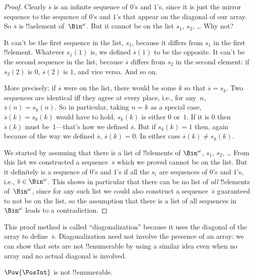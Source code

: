 \documentclass[../../../include/open-logic-section]{subfiles}
\begin{document}
\begin{proof}
Clearly $\overline{s}$ is an infinite sequence of $0$'s and
$1$'s, since it is just the mirror sequence to the sequence of $0$'s
and $1$'s that appear on the diagonal of our array.  So $\overline{s}$
is !!a{element} of~$\Bin^\omega$.  But it cannot be on the list $s_1$,
$s_2$, \dots{} Why not?

It can't be the first sequence in the list, $s_1$, because it differs from
$s_1$ in the first !!{element}.  Whatever $s_1(1)$ is, we defined
$\overline{s}(1)$ to be the opposite.  It can't be the second
sequence in the list, because $\overline{s}$ differs from $s_2$ in the second
element: if $s_2(2)$ is $0$, $\overline{s}(2)$ is $1$, and vice
versa. And so on.

More precisely: if $\overline{s}$ were on the list, there would be
some $k$ so that $\overline{s} = s_{k}$.  Two sequences are identical
iff they agree at every place, i.e., for any~$n$, $\overline{s}(n) =
s_{k}(n)$.  So in particular, taking $n = k$ as a special case,
$\overline{s}(k) = s_{k}(k)$ would have to hold. $s_k(k)$ is either
$0$ or~$1$. If it is $0$ then $\overline{s}(k)$ must be~$1$---that's
how we defined $\overline{s}$. But if $s_k(k) = 1$ then, again because
of the way we defined $\overline{s}$, $\overline{s}(k) = 0$. In either
case $\overline{s}(k) \neq s_{k}(k)$.

We started by assuming that there is a list of !!{element}s of
$\Bin^\omega$, $s_1$, $s_2$, \dots{} From this list we constructed a
sequence~$\overline{s}$ which we proved cannot be on the list.  But it
definitely is a sequence of $0$'s and $1$'s if all the $s_i$ are
sequences of $0$'s and $1$'s, i.e., $\overline{s} \in
\Bin^\omega$. This shows in particular that there can be no list of
\emph{all} !!{element}s of~$\Bin^\omega$, since for any such list we
could also construct a sequence~$\overline{s}$ guaranteed to not be on
the list, so the assumption that there is a list of all sequences
in~$\Bin^\omega$ leads to a contradiction.
\end{proof}

\begin{explain}
This proof method is called ``diagonalization'' because it uses the
diagonal of the array to define~$\overline{s}$. Diagonalization need
not involve the presence of an array: we can show that sets are not
!!{enumerable} by using a similar idea even when no array and no
actual diagonal is involved.
\end{explain}

\begin{thm}
$\Pow{\PosInt}$ is not !!{enumerable}.
\end{thm}
\end{document}
